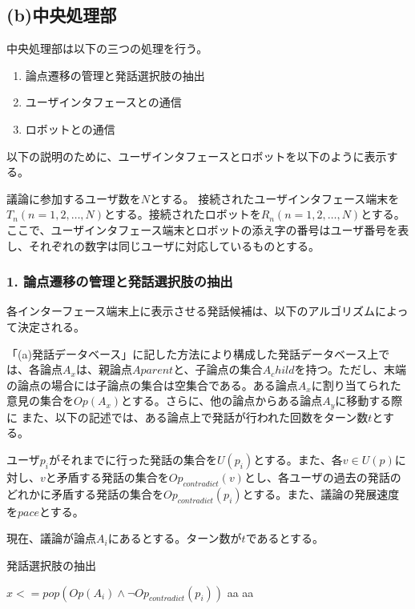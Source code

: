 \documentclass[11pt, a4paper]{jreport} %
\begin{document}
\subsection*{(b)中央処理部}
中央処理部は以下の三つの処理を行う。
\begin{enumerate}
\item 論点遷移の管理と発話選択肢の抽出
\item ユーザインタフェースとの通信
\item ロボットとの通信
\end{enumerate}


以下の説明のために、ユーザインタフェースとロボットを以下のように表示する。


議論に参加するユーザ数を$N$とする。
接続されたユーザインタフェース端末を$T_n (n = 1, 2, \dots, N)$とする。接続されたロボットを$R_n (n = 1, 2, \dots, N)$とする。ここで、ユーザインタフェース端末とロボットの添え字の番号はユーザ番号を表し、それぞれの数字は同じユーザに対応しているものとする。


\subsubsection{1. 論点遷移の管理と発話選択肢の抽出}
各インターフェース端末上に表示させる発話候補は、以下のアルゴリズムによって決定される。


「(a)発話データベース」に記した方法により構成した発話データベース上では、各論点$A_x$は、親論点$Aparent$と、子論点の集合$A_child$を持つ。ただし、末端の論点の場合には子論点の集合は空集合である。ある論点$A_x$に割り当てられた意見の集合を$Op(A_x)$とする。さらに、他の論点からある論点$A_y$に移動する際に
また、以下の記述では、ある論点上で発話が行われた回数をターン数$t$とする。


ユーザ$p_i$がそれまでに行った発話の集合を$U(p_i)$とする。また、各$v \in U(p)$に対し、$v$と矛盾する発話の集合を$Op_{contradict}(v)$とし、各ユーザの過去の発話のどれかに矛盾する発話の集合を$Op_{contradict}(p_i)$とする。また、議論の発展速度を$pace$とする。


現在、議論が論点$A_i$にあるとする。ターン数が$t$であるとする。
\begin{algorithm}
\caption{発話選択肢の抽出}
\begin{algorithmic}[1]
 \STATE $x <= pop(Op(A_i) \land \lnot Op_{contradict}(p_i))$
 \STATE aa
 \ENDIF
\ELSE
 \STATE aa
\ENDIF

\end{algorithmic} 
\end{algorithm}
\end{document}

